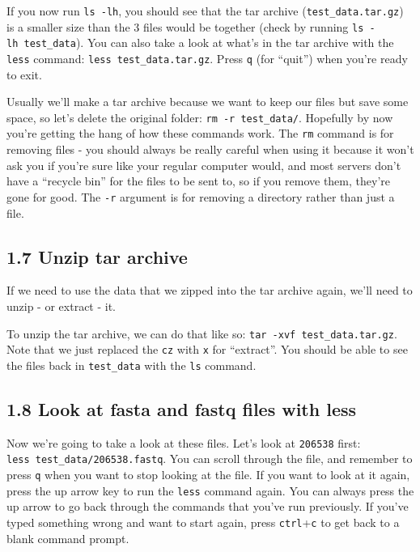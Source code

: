 \documentclass[
]{book}
\begin{document}
If you now run \texttt{ls\ -lh}, you should see that the tar archive (\texttt{test\_data.tar.gz}) is a smaller size than the 3 files would be together (check by running \texttt{ls\ -lh\ test\_data}). You can also take a look at what's in the tar archive with the \texttt{less} command: \texttt{less\ test\_data.tar.gz}. Press \texttt{q} (for ``quit'') when you're ready to exit.

Usually we'll make a tar archive because we want to keep our files but save some space, so let's delete the original folder: \texttt{rm\ -r\ test\_data/}. Hopefully by now you're getting the hang of how these commands work. The \texttt{rm} command is for removing files - you should always be really careful when using it because it won't ask you if you're sure like your regular computer would, and most servers don't have a ``recycle bin'' for the files to be sent to, so if you remove them, they're gone for good. The \texttt{-r} argument is for removing a directory rather than just a file.

\subsection{1.7 Unzip tar archive}\label{unzip-tar-archive}

If we need to use the data that we zipped into the tar archive again, we'll need to unzip - or extract - it.

To unzip the tar archive, we can do that like so: \texttt{tar\ -xvf\ test\_data.tar.gz}. Note that we just replaced the \texttt{cz} with \texttt{x} for ``extract''. You should be able to see the files back in \texttt{test\_data} with the \texttt{ls} command.

\subsection{1.8 Look at fasta and fastq files with less}\label{look-at-fasta-and-fastq-files-with-less}

Now we're going to take a look at these files. Let's look at \texttt{206538} first: \texttt{less\ test\_data/206538.fastq}. You can scroll through the file, and remember to press \texttt{q} when you want to stop looking at the file. If you want to look at it again, press the up arrow key to run the \texttt{less} command again. You can always press the up arrow to go back through the commands that you've run previously. If you've typed something wrong and want to start again, press \texttt{ctrl}+\texttt{c} to get back to a blank command prompt.
\end{document}
